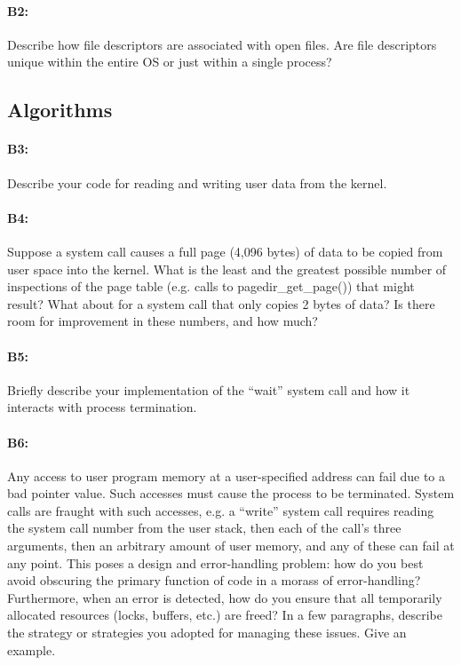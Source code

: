 \paragraph{B2:} %
Describe how file descriptors are associated with open files. Are file descriptors unique within the entire OS or just within a single process?

\subsection{Algorithms}
\paragraph{B3:} %
Describe your code for reading and writing user data from the kernel.

\paragraph{B4:} %
Suppose a system call causes a full page (4,096 bytes) of data to be copied from user space into the kernel.  What is the least and the greatest possible number of inspections of the page table (e.g. calls to pagedir\_get\_page()) that might result?  What about for a system call that only copies 2 bytes of data?  Is there room for improvement in these numbers, and how much?

\paragraph{B5:} %
Briefly describe your implementation of the ``wait'' system call and how it interacts with process termination.

\paragraph{B6:} %
Any access to user program memory at a user-specified address can fail due to a bad pointer value.  Such accesses must cause the process to be terminated.  System calls are fraught with such accesses, e.g. a ``write'' system call requires reading the system call number from the user stack, then each of the call's three arguments, then an arbitrary amount of user memory, and any of these can fail at any point.  This poses a design and error-handling problem: how do you best avoid obscuring the primary function of code in a morass of error-handling?  Furthermore, when an error is detected, how do you ensure that all temporarily allocated resources (locks, buffers, etc.) are freed?  In a few paragraphs, describe the strategy or strategies you adopted for managing these issues.  Give an example.


